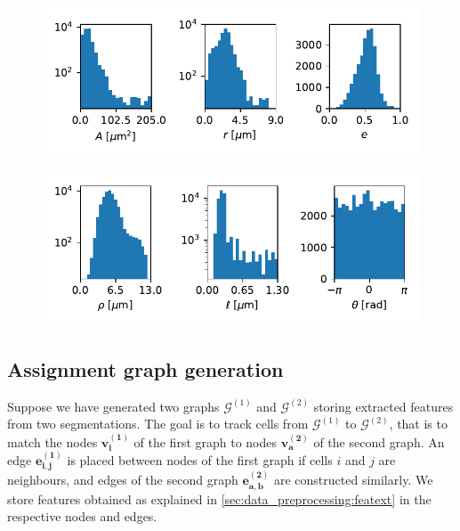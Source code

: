 \documentclass[10pt,conference,compsocconf,a4paper]{IEEEtran}
\newcommand{\G}{\mathcal{G}}
\renewcommand{\vec}[1]{\boldsymbol{#1}}
\newcommand*{\shortautoref}[1]{%
	\begingroup
	\def\equationautorefname{\textsc{Eq.}}%
	\def\tableautorefname{\textsc{Tab.}}%
	\def\figureautorefname{\textsc{Fig.}}%
	\autoref{#1}%
	\endgroup
}
\begin{document}

		\begin{figure}
			\centering
			\includegraphics[width=\linewidth]{figures/hist_x.pdf}
			\label{fig:hist_x}
		\end{figure}
	
		\begin{figure}
			\centering
			\includegraphics[width=\linewidth]{figures/hist_e.pdf}
			\label{fig:hist_e}
		\end{figure}

	\subsection{Assignment graph generation}

		Suppose we have generated two graphs $\G^{(1)}$ and $\G^{(2)}$ storing extracted features from two segmentations. The goal is to track cells from $\G^{(1)}$ to $\G^{(2)}$, that is to match the nodes $\vec{v_i^{(1)}}$ of the first graph to nodes $\vec{v_a^{(2)}}$ of the second graph. An edge $\vec{e_{i,j}^{(1)}}$ is placed between nodes of the first graph if cells $i$ and $j$ are neighbours, and edges of the second graph $\vec{e_{a,b}^{(2)}}$ are constructed similarly. We store features obtained as explained in \shortautoref{sec:data_preprocessing:featext} in the respective nodes and edges.
		
\end{document}
